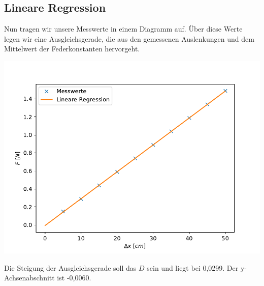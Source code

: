 \documentclass[titlepage = firstcover]{scrartcl}
\begin{document}
        \newpage
        \subsection{Lineare Regression} 
        Nun tragen wir unsere Messwerte in einem Diagramm auf. Über diese Werte legen wir
        eine Ausgleichsgerade, die aus den gemessenen Auslenkungen und dem Mittelwert der Federkonstanten hervorgeht.
        
        \begin{center}
          \includegraphics[width=0.8\linewidth]{Hookgraph.pdf}
        \end{center}

        Die Steigung der Ausgleichsgerade soll das $D$ sein und liegt bei 0,0299. Der y-Achsenabschnitt ist -0,0060.

        
\end{document}
